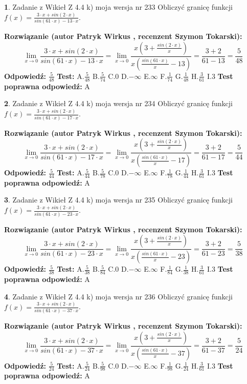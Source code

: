 \documentclass[12pt, a4paper]{article}
\theoremstyle{definition} %
\newtheorem{zad}{}
\newcommand{\zadStart}[1]{\begin{zad}#1\newline}
\newcommand{\zadStop}{\end{zad}}
\newcommand{\rozwStart}[2]{\noindent \textbf{Rozwiązanie (autor #1 , recenzent #2): }\newline}
\newcommand{\rozwStop}{\newline}
\newcommand{\odpStart}{\noindent \textbf{Odpowiedź:}\newline}
\newcommand{\odpStop}{\newline}
\newcommand{\testStart}{\noindent \textbf{Test:}\newline}
\newcommand{\testStop}{\newline}
\newcommand{\kluczStart}{\noindent \textbf{Test poprawna odpowiedź:}\newline}
\newcommand{\kluczStop}{\newline}
\begin{document}
\zadStart{Zadanie z Wikieł Z 4.4 k) moja wersja nr 233}
Obliczyć granicę funkcji $f(x)=\frac{3\cdot x +sin(2\cdot x)}{sin(61\cdot x) -13\cdot x}$.
\zadStop
\rozwStart{Patryk Wirkus}{Szymon Tokarski}
$$\lim\limits_{x\to 0}\frac{3\cdot x +sin(2\cdot x)}{sin(61\cdot x) -13\cdot x}
=\lim\limits_{x\to 0}\frac{x(3+\frac{sin(2\cdot x)}{x})}{x(\frac{sin(61\cdot x)}{x}-13)}
=\frac{3+2}{61-13} = \frac{5}{48}$$
\rozwStop
\odpStart
$\frac{5}{48}$
\odpStop
\testStart
A.$\frac{5}{48}$
B.$\frac{5}{74}$
C.$0$
D.$-\infty$
E.$\infty$
F.$\frac{1}{74}$
G.$\frac{1}{48}$
H.$\frac{3}{61}$
I.$3$
\testStop
\kluczStart
A
\kluczStop



\zadStart{Zadanie z Wikieł Z 4.4 k) moja wersja nr 234}
Obliczyć granicę funkcji $f(x)=\frac{3\cdot x +sin(2\cdot x)}{sin(61\cdot x) -17\cdot x}$.
\zadStop
\rozwStart{Patryk Wirkus}{Szymon Tokarski}
$$\lim\limits_{x\to 0}\frac{3\cdot x +sin(2\cdot x)}{sin(61\cdot x) -17\cdot x}
=\lim\limits_{x\to 0}\frac{x(3+\frac{sin(2\cdot x)}{x})}{x(\frac{sin(61\cdot x)}{x}-17)}
=\frac{3+2}{61-17} = \frac{5}{44}$$
\rozwStop
\odpStart
$\frac{5}{44}$
\odpStop
\testStart
A.$\frac{5}{44}$
B.$\frac{5}{78}$
C.$0$
D.$-\infty$
E.$\infty$
F.$\frac{1}{78}$
G.$\frac{1}{44}$
H.$\frac{3}{61}$
I.$3$
\testStop
\kluczStart
A
\kluczStop



\zadStart{Zadanie z Wikieł Z 4.4 k) moja wersja nr 235}
Obliczyć granicę funkcji $f(x)=\frac{3\cdot x +sin(2\cdot x)}{sin(61\cdot x) -23\cdot x}$.
\zadStop
\rozwStart{Patryk Wirkus}{Szymon Tokarski}
$$\lim\limits_{x\to 0}\frac{3\cdot x +sin(2\cdot x)}{sin(61\cdot x) -23\cdot x}
=\lim\limits_{x\to 0}\frac{x(3+\frac{sin(2\cdot x)}{x})}{x(\frac{sin(61\cdot x)}{x}-23)}
=\frac{3+2}{61-23} = \frac{5}{38}$$
\rozwStop
\odpStart
$\frac{5}{38}$
\odpStop
\testStart
A.$\frac{5}{38}$
B.$\frac{5}{84}$
C.$0$
D.$-\infty$
E.$\infty$
F.$\frac{1}{84}$
G.$\frac{1}{38}$
H.$\frac{3}{61}$
I.$3$
\testStop
\kluczStart
A
\kluczStop



\zadStart{Zadanie z Wikieł Z 4.4 k) moja wersja nr 236}
Obliczyć granicę funkcji $f(x)=\frac{3\cdot x +sin(2\cdot x)}{sin(61\cdot x) -37\cdot x}$.
\zadStop
\rozwStart{Patryk Wirkus}{Szymon Tokarski}
$$\lim\limits_{x\to 0}\frac{3\cdot x +sin(2\cdot x)}{sin(61\cdot x) -37\cdot x}
=\lim\limits_{x\to 0}\frac{x(3+\frac{sin(2\cdot x)}{x})}{x(\frac{sin(61\cdot x)}{x}-37)}
=\frac{3+2}{61-37} = \frac{5}{24}$$
\rozwStop
\odpStart
$\frac{5}{24}$
\odpStop
\testStart
A.$\frac{5}{24}$
B.$\frac{5}{98}$
C.$0$
D.$-\infty$
E.$\infty$
F.$\frac{1}{98}$
G.$\frac{1}{24}$
H.$\frac{3}{61}$
I.$3$
\testStop
\kluczStart
A
\kluczStop
\end{document}
